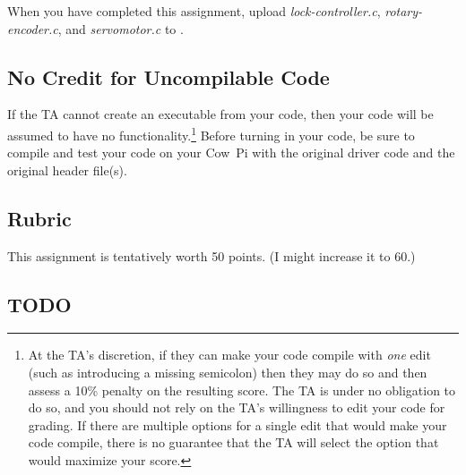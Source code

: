 When you have completed this assignment, upload \textit{lock-controller.c}, \textit{rotary-encoder.c}, and \textit{servomotor.c} to \filesubmission.

\subsection*{No Credit for Uncompilable Code}
If the TA cannot create an executable from your code, then your code will be assumed to have no functionality.\footnote{
    At the TA's discretion, if they can make your code compile with \textit{one} edit (such as introducing a missing semicolon) then they may do so and then assess a 10\% penalty on the resulting score.
    The TA is under no obligation to do so, and you should not rely on the TA's willingness to edit your code for grading.
    If there are multiple options for a single edit that would make your code compile, there is no guarantee that the TA will select the option that would maximize your score.
}
Before turning in your code, be sure to compile and test your code on your Cow~Pi with the original driver code and the original header file(s).

\interruptlablatepolicy

\subsection*{Rubric}

This assignment is tentatively worth 50 points.
(I might increase it to 60.)

\subsection*{TODO}

